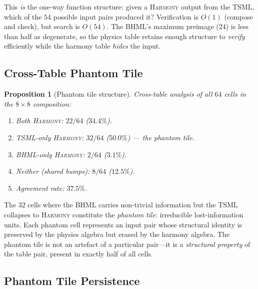 \documentclass[11pt]{article}
\newtheorem{proposition}[theorem]{Proposition}
\theoremstyle{definition}
\theoremstyle{remark}
\begin{document}
\noindent
This \emph{is} the one-way function structure: given a \textsc{Harmony} output from the TSML, which of the $54$ possible input pairs produced it?  Verification is $O(1)$ (compose and check), but search is $O(54)$.  The BHML's maximum preimage ($24$) is less than half as degenerate, so the physics table retains enough structure to \emph{verify} efficiently while the harmony table \emph{hides} the input.

\subsection{Cross-Table Phantom Tile}
\label{ssec:pnp-phantom}

\begin{proposition}[Phantom tile structure]
\label{prop:pnp-phantom-tile}
Cross-table analysis of all $64$ cells in the $8\times 8$ composition:
\begin{enumerate}
  \item Both \textsc{Harmony}: $22/64$ ($34.4\%$).
  \item TSML-only \textsc{Harmony}: $32/64$ ($50.0\%$) --- the \emph{phantom tile}.
  \item BHML-only \textsc{Harmony}: $2/64$ ($3.1\%$).
  \item Neither (shared bumps): $8/64$ ($12.5\%$).
  \item Agreement rate: $37.5\%$.
\end{enumerate}
\end{proposition}

\noindent
The $32$ cells where the BHML carries non-trivial information but the TSML collapses to \textsc{Harmony} constitute the \emph{phantom tile}: irreducible lost-information units.  Each phantom cell represents an input pair whose structural identity is preserved by the physics algebra but erased by the harmony algebra.  The phantom tile is not an artefact of a particular pair---it is a \emph{structural property} of the table pair, present in exactly half of all cells.

\subsection{Phantom Tile Persistence}
\label{ssec:pnp-persistence}
\end{document}

